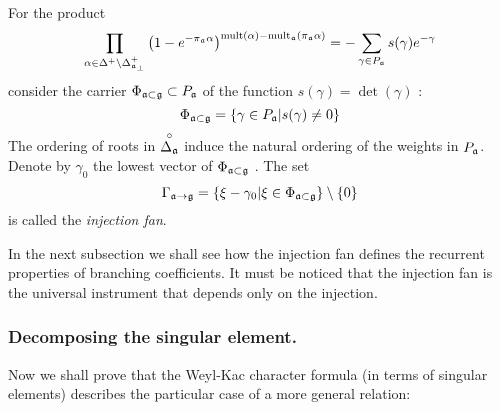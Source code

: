 \begin{definition}
\label{fan-definition} For the product
\begin{equation}
\prod_{\alpha \in \Delta ^{+}\setminus \Delta _{\afb }^{+}}\left( 1-e^{-\pi
_{\af}\alpha }\right) ^{\mathrm{mult}(\alpha )-\mathrm{mult}_{\af%
}(\pi _{\af}\alpha )}=-\sum_{\gamma \in P_{\af}}s(\gamma
)e^{-\gamma }  \label{eq:6}
\end{equation}
consider the carrier $\Phi _{\mathfrak{a}\subset \frak{g}}\subset P_{\mathfrak{a}}$
of the function $s(\gamma )=\det \left( \gamma \right) $ :
\begin{equation}
\Phi _{\mathfrak{a}\subset \frak{g}}=\left\{ \gamma \in P_{\mathfrak{a}}|s(\gamma
)\neq 0\right\}   \label{eq:37}
\end{equation}
The ordering of roots in $\stackrel{\circ }{\Delta _{\mathfrak{a}}}$ induce the
natural ordering of the weights in $P_{\mathfrak{a}}$. Denote by $\gamma _{0}$
the lowest vector of $\Phi _{\mathfrak{a}\subset \frak{g}}$ . The set
\begin{equation}
\Gamma _{\af\rightarrow \frak{g}}=\left\{ \xi -\gamma _{0}|\xi \in \Phi _{%
\af\subset \frak{g}}\right\} \setminus \left\{ 0\right\}
\label{fan-defined}
\end{equation}
is called the \textit{injection fan}.
\end{definition}
In the next subsection we shall see how the injection fan defines the recurrent
properties of branching coefficients. It must be noticed that the injection fan is
the universal instrument that depends only on the injection.

\subsubsection{Decomposing the singular element.}
\label{subsec:decomp-sing-element}

Now we shall prove that the Weyl-Kac character formula (in terms of singular
elements) describes the particular case of a more general relation:

